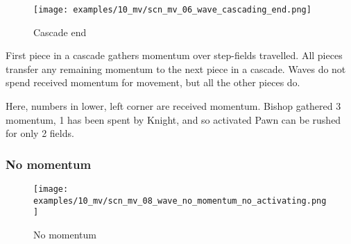 \vspace*{-5.0ex}
\noindent
\begin{figure}[h]
\texttt{[image: examples/10\_mv/scn\_mv\_06\_wave\_cascading\_end.png]}
\caption{Cascade end}
\label{fig:scn_mv_06_wave_cascading_end}
\end{figure}

First piece in a cascade gathers momentum over step-fields travelled. All pieces
transfer any remaining momentum to the next piece in a cascade. Waves do not spend
received momentum for movement, but all the other pieces do.

Here, numbers in lower, left corner are received momentum. Bishop gathered 3 momentum,
1 has been spent by Knight, and so activated Pawn can be rushed for only 2 fields.





\clearpage %

\subsubsection*{No momentum}

\vspace*{-3.0ex}
\noindent
\begin{figure}[h]
\texttt{[image: examples/10\_mv/scn\_mv\_08\_wave\_no\_momentum\_no\_activating.png]}
\caption{No momentum}
\label{fig:scn_mv_08_wave_no_momentum_no_activating}
\end{figure}

